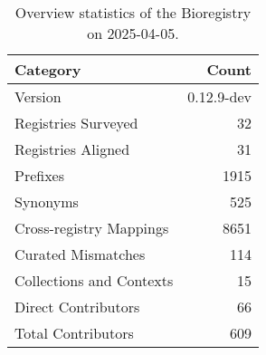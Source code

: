 \begin{table}
\caption{Overview statistics of the Bioregistry on 2025-04-05.}
\label{tab:bioregistry-summary}
\begin{tabular}{lr}
\toprule
Category & Count \\
\midrule
Version & 0.12.9-dev \\
Registries Surveyed & 32 \\
Registries Aligned & 31 \\
Prefixes & 1915 \\
Synonyms & 525 \\
Cross-registry Mappings & 8651 \\
Curated Mismatches & 114 \\
Collections and Contexts & 15 \\
Direct Contributors & 66 \\
Total Contributors & 609 \\
\bottomrule
\end{tabular}
\end{table}
